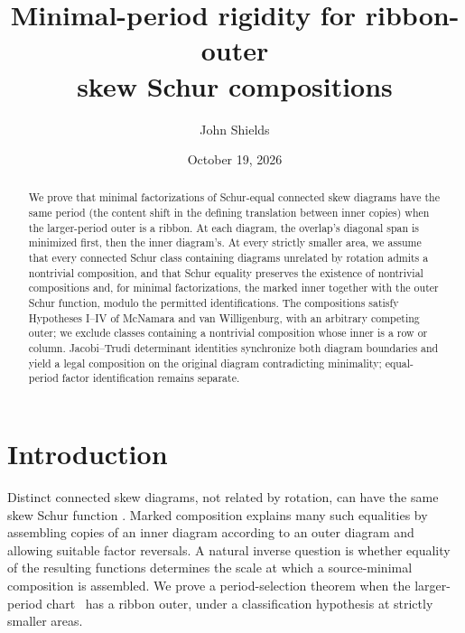 \documentclass[11pt,a4paper]{amsart}
\title[Minimal-period rigidity for ribbon-outer skew Schur compositions]{Minimal-period rigidity for ribbon-outer\\skew Schur compositions}
\author{John Shields}
\date{October 19, 2026}
\numberwithin{equation}{section}
\theoremstyle{plain}
\theoremstyle{definition}
\begin{document}
\begin{abstract}
We prove that minimal factorizations of Schur-equal connected skew diagrams
have the same period (the content shift in the defining translation between
inner copies) when the larger-period outer is a ribbon.  At each diagram,
the overlap's diagonal span is minimized first, then the inner diagram's.
At every strictly smaller area, we assume that every connected Schur class
containing diagrams unrelated by rotation admits a nontrivial composition,
and that Schur equality preserves the existence of nontrivial compositions
and, for minimal factorizations, the marked inner together with the outer
Schur function, modulo the permitted identifications.  The compositions
satisfy Hypotheses I--IV of McNamara and van Willigenburg, with an arbitrary
competing outer; we exclude classes containing a nontrivial composition
whose inner is a row or column.  Jacobi--Trudi determinant identities
synchronize both diagram boundaries and yield a legal composition on the
original diagram contradicting minimality; equal-period factor
identification remains separate.
\end{abstract}
\maketitle


\section{Introduction}\label{sec:introduction}

Distinct connected skew diagrams, not related by rotation, can have
the same skew Schur function \cite[Ex.~7.8]{Reiner2007Coincidences}.
Marked composition explains many such equalities by assembling copies of an
inner diagram according to an outer diagram and allowing suitable factor
reversals.  A natural inverse question is whether equality of the resulting
functions determines the scale at which a source-minimal composition is
assembled.  We prove a period-selection theorem when the larger-period
chart~\cite{Shields2026Gluing} has a ribbon outer, under a classification
hypothesis at strictly smaller areas.
\end{document}
